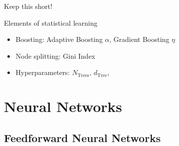 Keep this short!

Elements of statistical learning \cite{esl}

\begin{itemize}
\item Boosting: Adaptive Boosting $\alpha$, Gradient Boosting $\eta$
\item Node splitting: Gini Index
\item Hyperparameters: $N_\mathrm{Trees}$, $d_\mathrm{Tree}$,
\end{itemize}

\section{Neural Networks}
\label{sec:nn}


\subsection{Feedforward Neural Networks}
\label{sec:nn_feedforward}


